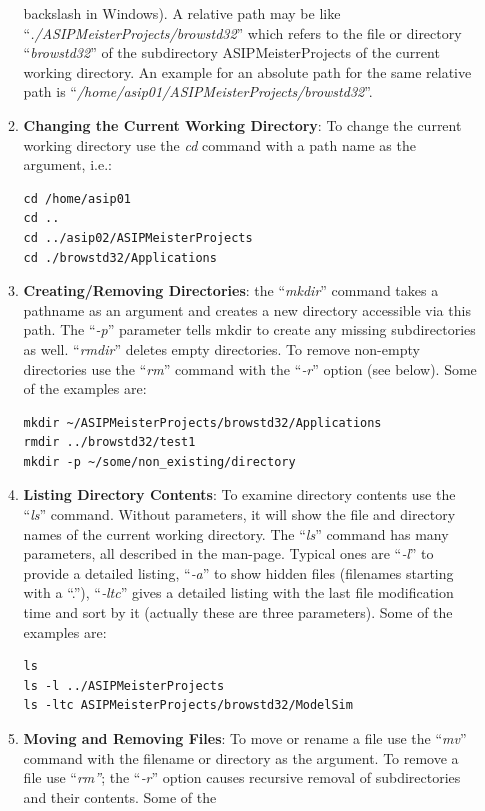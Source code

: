 \begin{itemize}
\begin{enumerate}
    backslash in Windows). A relative path may be like
    ``\emph{./ASIPMeisterProjects/browstd32}'' which refers to the file
    or directory ``\emph{browstd32}'' of the subdirectory
    ASIPMeisterProjects of the current working directory. An example for
    an absolute path for the same relative path is
    ``\emph{/home/asip01/ASIPMeisterProjects/browstd32}''.
  \item
    \textbf{Changing the Current Working Directory}: To change the
    current working directory use the \emph{cd} command with a path name
    as the argument, i.e.:
\begin{lstlisting}
cd /home/asip01
cd ..
cd ../asip02/ASIPMeisterProjects
cd ./browstd32/Applications
\end{lstlisting}
\item
  \textbf{Creating/Removing Directories}: the ``\emph{mkdir}'' command
  takes a pathname as an argument and creates a new directory accessible
  via this path. The ``\emph{-p}'' parameter tells mkdir to create any
  missing subdirectories as well. ``\emph{rmdir}'' deletes empty
  directories. To remove non-empty directories use the ``\emph{rm}''
  command with the ``\emph{‑r}'' option (see below). Some of the
  examples are:
\begin{lstlisting}
mkdir ~/ASIPMeisterProjects/browstd32/Applications
rmdir ../browstd32/test1
mkdir -p ~/some/non_existing/directory
\end{lstlisting}
\item
  \textbf{Listing Directory Contents}: To examine directory contents use
  the ``\emph{ls}'' command. Without parameters, it will show the file
  and directory names of the current working directory. The
  ``\emph{ls}'' command has many parameters, all described in the
  man-page. Typical ones are ``\emph{‑l}'' to provide a detailed
  listing, ``\emph{‑a}'' to show hidden files (filenames starting with a
  ``.''), ``\emph{‑ltc}'' gives a detailed listing with the last file
  modification time and sort by it (actually these are three
  parameters). Some of the examples are:
\begin{lstlisting}
ls
ls -l ../ASIPMeisterProjects
ls -ltc ASIPMeisterProjects/browstd32/ModelSim
\end{lstlisting}
\item
  \textbf{Moving and Removing Files}: To move or rename a file use the
  ``\emph{mv}'' command with the filename or directory as the argument.
  To remove a file use ``\emph{rm''}; the ``\emph{‑r}'' option causes
  recursive removal of subdirectories and their contents. Some of the

\end{enumerate}
\end{itemize}
